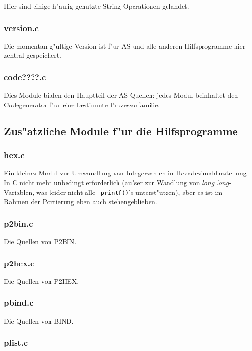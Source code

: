 \documentclass[12pt,a4paper,twoside]{report}
\newcommand{\asname}{AS}
\begin{document}
Hier sind einige h"aufig genutzte String-Operationen gelandet.

\subsubsection{version.c}

Die momentan g"ultige Version ist f"ur \asname{} und alle anderen Hilfsprogramme
hier zentral gespeichert.

\subsubsection{code????.c}

Dies Module bilden den Hauptteil der \asname{}-Quellen: jedes Modul beinhaltet
den Codegenerator f"ur eine bestimmte Prozessorfamilie.

\subsection{Zus"atzliche Module f"ur die Hilfsprogramme}

\subsubsection{hex.c}

Ein kleines Modul zur Umwandlung von Integerzahlen in
Hexadezimaldarstellung.  In C nicht mehr unbedingt erforderlich (au"ser
zur Wandlung von {\em long long}-Variablen, was leider nicht alle {\tt
printf()}'s unterst"utzen), aber es ist im Rahmen der Portierung eben auch
stehengeblieben.

\subsubsection{p2bin.c}

Die Quellen von P2BIN.

\subsubsection{p2hex.c}

Die Quellen von P2HEX.

\subsubsection{pbind.c}

Die Quellen von BIND.

\subsubsection{plist.c}
\end{document}
